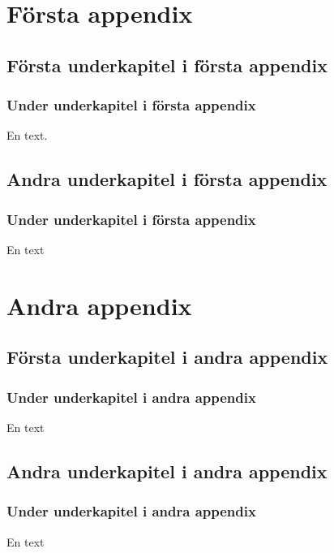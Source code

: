 \documentclass[10pt,oneside,swedish]{lips-no_customer}
\begin{document}
\clearpage


\cleardoublepage
\appendix
\section{Första appendix}
\subsection{Första underkapitel i första appendix}
\lipsum[5]

\subsubsection{Under underkapitel i första appendix}
En text.

\subsection{Andra underkapitel i första appendix}
\lipsum[5]
\subsubsection{Under underkapitel i första appendix}
En text

\section{Andra appendix}
\subsection{Första underkapitel i andra appendix}
\lipsum[5]

\subsubsection{Under underkapitel i andra appendix}
En text

\subsection{Andra underkapitel i andra appendix}
\lipsum[5]
\subsubsection{Under underkapitel i andra appendix}
En text
\end{document}
